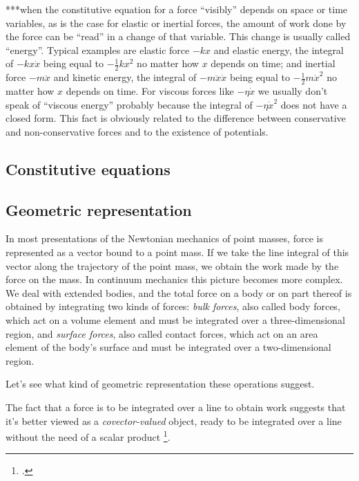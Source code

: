 \documentclass[\ifafour a4paper,12pt,\else a5paper,10pt,\fi%
onecolumn,oneside,article,%
british%
]{memoir}
\theoremstyle{remark}
\theoremstyle{innote}
\newcommand*{\citep}{\footcites}%
\renewcommand*{\|}{\nonscript\,\vert\nonscript\;\mathopen{}}
\newcommand*{\sect}{\S}%
\newcommand*{\chap}{ch.}%
\newcommand*{\chaps}{chs}%
\begin{document}
***when the constitutive equation for a force \enquote{visibly} depends on
space or time variables, as is the case for elastic or inertial forces, the
amount of work done by the force can be \enquote{read} in a change of that
variable. This change is usually called \enquote{energy}. Typical examples
are elastic force $-kx$ and elastic energy, the integral of $-kx\Dot{x}$
being equal to $-\frac{1}{2}kx^2$ no matter how $x$ depends on time; and
inertial force $-m\ddot{x}$ and kinetic energy, the integral of
$-m\ddot{x}\Dot{x}$ being equal to $-\frac{1}{2}m\Dot{x}^2$ no matter how
$x$ depends on time. For viscous forces like $-\eta\Dot{x}$ we usually
don't speak of \enquote{viscous energy} probably because the integral of
$-\eta\Dot{x}^2$ does not have a closed form. This fact is obviously
related to the difference between conservative and non-conservative forces
and to the existence of potentials.

\subsection{Constitutive equations}
\label{sec:constit_eq}



\subsection{Geometric representation}
\label{sec:geometry_force}

In most presentations of the Newtonian mechanics of point masses, force is
represented as a vector bound to a point mass. If we take the line integral
of this vector along the trajectory of the point mass, we obtain the work
made by the force on the mass. In continuum mechanics this picture becomes
more complex. We deal with extended bodies, and the total force on a body
or on part thereof is obtained by integrating two kinds of forces:
\emph{bulk forces}, also called body forces, which act on a volume element
and must be integrated over a three-dimensional region, and \emph{surface
  forces}, also called contact forces, which act on an area element of the
body's surface and must be integrated over a two-dimensional region.

Let's see what kind of geometric representation these operations suggest.

The fact that a force is to be integrated over a line to obtain work
suggests that it's better viewed as a \emph{covector-valued} object, ready
to be integrated over a line without the need of a scalar product
\citep[\sect~12]{burke1995}[\sect~VII.2]{schouten1951}[\sect~2]{vandantzig1954}[\chaps~VI--VII]{burke1985_r1987}[\chap~7]{bambergetal1988_r1990}.
\end{document}
